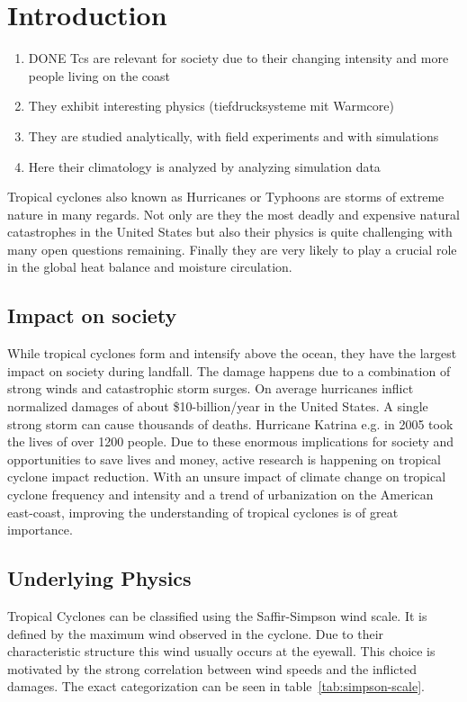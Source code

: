 \chapter{Introduction}\label{sec:introduction}
\begin{enumerate}
\item DONE Tcs are relevant for society due to their changing intensity and more people living on the coast
\item They exhibit interesting physics (tiefdrucksysteme mit Warmcore)
\item They are studied analytically, with field experiments and with simulations
\item Here their climatology is analyzed by analyzing simulation data
\end{enumerate}
Tropical cyclones also known as Hurricanes or Typhoons are storms of extreme nature in many regards. Not only are they the most deadly and expensive natural catastrophes in the United States but also their physics is quite challenging with many open questions remaining.\cite{emanuel-summ}
Finally they are very likely to play a crucial role in the global heat balance and moisture circulation.\cite{moisture-transport}\cite{global-heat}

\section{Impact on society}\label{sec:society}
While tropical cyclones form and intensify above the ocean, they have the largest impact on society during landfall. The damage happens due to a combination of strong winds and catastrophic storm surges. On average hurricanes inflict normalized damages of about \$10-billion/year in the United States.\cite{damage-norm} A single strong storm can cause thousands of deaths. Hurricane Katrina e.g. in 2005 took the lives of over 1200 people.\cite{hurr-2005}
Due to these enormous implications for society and opportunities to save lives and money, active research is happening on tropical cyclone impact reduction. With an unsure impact of climate change on tropical cyclone frequency and intensity and a trend of urbanization on the American east-coast, improving the understanding of tropical cyclones is of great importance.

\section{Underlying Physics}\label{sec:physics}
Tropical Cyclones can be classified using the Saffir-Simpson wind scale. It is defined by the maximum wind observed in the cyclone. Due to their characteristic structure this wind usually occurs at the eyewall. This choice is motivated by the strong correlation between wind speeds and the inflicted damages.\cite{simpson} The exact categorization can be seen in table~\ref{tab:simpson-scale}.

